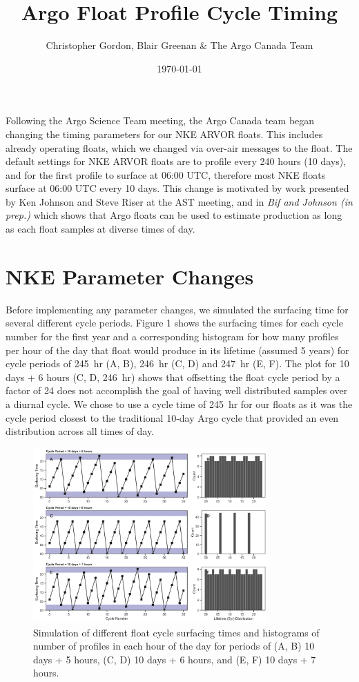 \documentclass[11pt]{article}
\title{Argo Float Profile Cycle Timing}
\author{Christopher Gordon, Blair Greenan \& The Argo Canada Team}
\date{\today}
\begin{document}
	\maketitle

    Following the Argo Science Team meeting, the Argo Canada team began changing the timing parameters for our NKE ARVOR floats. This includes already operating floats, which we changed via over-air messages to the float. The default settings for NKE ARVOR floats are to profile every 240 hours (10 days), and for the first profile to surface at 06:00 UTC, therefore most NKE floats surface at 06:00 UTC every 10 days. This change is motivated by work presented by Ken Johnson and Steve Riser at the AST meeting, and in \emph{Bif and Johnson (in prep.)} which shows that Argo floats can be used to estimate production as long as each float samples at diverse times of day. 

    \section{NKE Parameter Changes}

    Before implementing any parameter changes, we simulated the surfacing time for several different cycle periods. Figure 1 shows the surfacing times for each cycle number for the first year and a corresponding histogram for how many profiles per hour of the day that float would produce in its lifetime (assumed 5 years) for cycle periods of 245~hr (A, B), 246~hr (C, D) and 247~hr (E, F). The plot for 10 days + 6 hours (C, D, 246~hr) shows that offsetting the float cycle period by a factor of 24 does not accomplish the goal of having well distributed samples over a diurnal cycle. We chose to use a cycle time of 245~hr for our floats as it was the cycle period closest to the traditional 10-day Argo cycle that provided an even distribution across all times of day. 

    \begin{figure}[ht]
        \centering
        \includegraphics[width=0.8\textwidth]{../figures/profile_time_of_day_1yr_updated.png}
        \caption{Simulation of different float cycle surfacing times and histograms of number of profiles in each hour of the day for periods of (A, B) 10 days + 5 hours, (C, D) 10 days + 6 hours, and (E, F) 10 days + 7 hours.}
    \end{figure}
\end{document}
